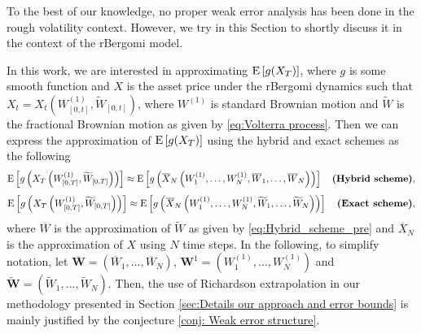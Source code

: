 To the best of our knowledge, no proper weak error
analysis has been done in the rough volatility context. However, we try in this Section  to shortly discuss it in the context of the rBergomi model.

In this work, we are interested in approximating $\mathrm{E}\left[g(X_T)\right]$, where $g$ is some smooth function and $X$ is the asset price under the rBergomi dynamics such that $X_t=X_t(W^{(1)}_{[0,t]},\widetilde{W}_{[0,t]})$, where $W^{(1)}$ is standard Brownian motion and  $\widetilde{W}$ is the fractional Brownian motion as given by \eqref{eq:Volterra process}.  Then we can express the approximation of $\mathrm{E}\left[g(X_T)\right]$  using the  hybrid and exact schemes as the following 
\begin{align*}
\mathrm{E}\left[g\left(X_T\left(W^{(1)}_{[0,T]},\widetilde{W}_{[0,T]}\right)\right)\right] \approx \mathrm{E}\left[g\left(\overline{X}_N\left(W^{(1)}_1,\dots,W^{(1)}_N, \overline{W}_1, \dots,\overline{W}_N\right)\right)\right] \quad \textbf{(Hybrid  scheme)},
\end{align*}
\begin{align*}
\mathrm{E}\left[g\left(X_T\left(W^{(1)}_{[0,T]},\widetilde{W}_{[0,T]}\right)\right)\right] \approx \mathrm{E}\left[g\left(\overline{X}_N\left(W^{(1)}_1,\dots,W^{(1)}_N, \widetilde{W}_1, \dots,\widetilde{W}_N\right)\right)\right] \quad \textbf{(Exact  scheme)},
\end{align*}
where $\overline{W}$ is the approximation of $\widetilde{W}$  as given by \eqref{eq:Hybrid_scheme_pre} and $\overline{X}_N$ is the approximation of $X$ using $N$ time steps. In the following, to simplify notation, let  $\overline{\mathbf{W}}=(\overline{W}_1,\dots,\overline{W}_N)$, $\mathbf{W}^{1}=(W^{(1)}_1,\dots,W^{(1)}_N)$ and $\widetilde{\mathbf{W}}=(\widetilde{W}_1,\dots,\widetilde{W}_N)$. Then, the use of Richardson extrapolation in our  methodology presented in Section \ref{sec:Details our approach and error bounds} is mainly justified  by the conjecture \ref{conj: Weak error structure}. 
